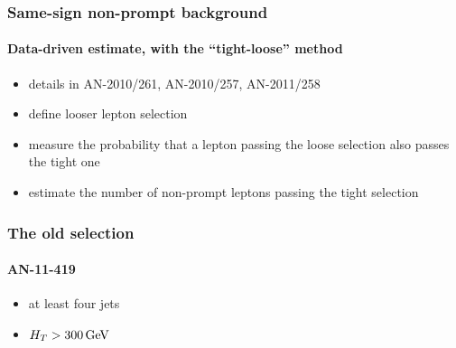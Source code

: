 \documentclass[ukenglish]{beamer}
\begin{document}
\begin{frame}
    \frametitle{Same-sign non-prompt background}
    \framesubtitle{Data-driven estimate, with the ``tight-loose'' method}
    \begin{itemize}
        \item details in AN-2010/261, AN-2010/257, AN-2011/258
        \item define looser lepton selection
        \item measure the probability that a lepton passing the loose
            selection also passes the tight one
        \item estimate the number of non-prompt leptons passing the tight
            selection
    \end{itemize}
\end{frame}

\begin{frame}
    \frametitle{The old selection}
    \framesubtitle{AN-11-419}
    \begin{itemize}
        \item at least four jets
        \item $H_T > \unit[300]{GeV}$
    \end{itemize}
\end{frame}
\end{document}
